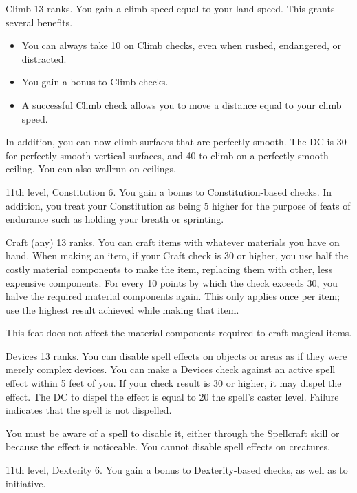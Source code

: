 \featpre Climb 13 ranks.
\featben You gain a climb speed equal to your land speed.
This grants several benefits.
\begin{itemize}
    \item You can always take 10 on Climb checks, even when rushed, endangered, or distracted.
    \item You gain a  bonus to Climb checks.
    \item A successful Climb check allows you to move a distance equal to your climb speed.
\end{itemize}

In addition, you can now climb surfaces that are perfectly smooth.
The DC is 30 for perfectly smooth vertical surfaces, and 40 to climb on a perfectly smooth ceiling.
You can also wallrun on ceilings.

\featpres 11th level, Constitution 6.
\featben You gain a  bonus to Constitution-based checks.
In addition, you treat your Constitution as being 5 higher for the purpose of feats of endurance such as holding your breath or sprinting.

\featpre Craft (any) 13 ranks.
\featben You can craft items with whatever materials you have on hand.
When making an item, if your Craft check is 30 or higher, you use half the costly material components to make the item, replacing them with other, less expensive components.
For every 10 points by which the check exceeds 30, you halve the required material components again.
This only applies once per item; use the highest result achieved while making that item.

This feat does not affect the material components required to craft magical items.

\featpre Devices 13 ranks.
\featben You can disable spell effects on objects or areas as if they were merely complex devices.
You can make a Devices check against an active spell effect within 5 feet of you.
If your check result is 30 or higher, it may dispel the effect.
The DC to dispel the effect is equal to 20 \add the spell's caster level.
Failure indicates that the spell is not dispelled.

You must be aware of a spell to disable it, either through the Spellcraft skill or because the effect is noticeable.
You cannot disable spell effects on creatures.

\featpres 11th level, Dexterity 6.
\featben You gain a  bonus to Dexterity-based checks, as well as to initiative.

